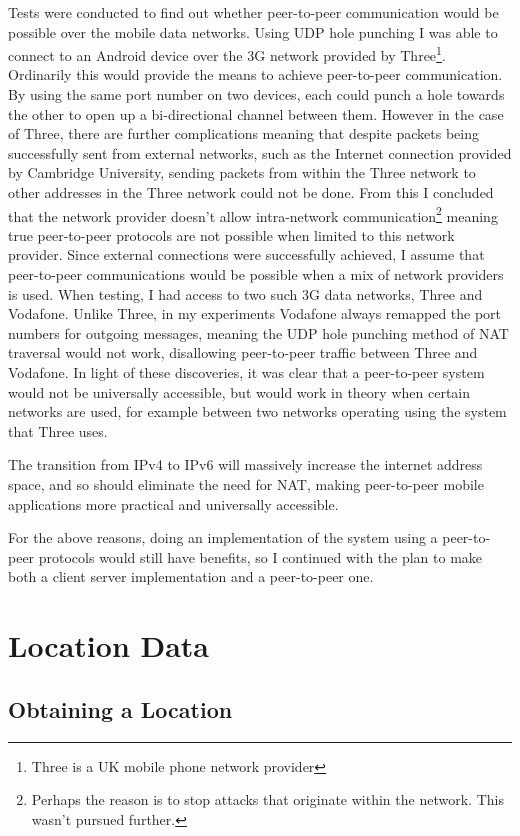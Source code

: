 Tests were conducted to find out whether peer-to-peer communication would be possible over the mobile data networks.
Using UDP hole punching I was able to connect to an Android device over the 3G network provided by Three\footnote{Three is a UK mobile phone network provider}. Ordinarily this would provide the means to achieve peer-to-peer communication. By using the same port number on two devices, each could punch a hole towards the other to open up a bi-directional channel between them. However in the case of Three, there are further complications meaning that despite packets being successfully sent from external networks, such as the Internet connection provided by Cambridge University, sending packets from within the Three network to other addresses in the Three network could not be done. From this I concluded that the network provider doesn't allow intra-network communication\footnote{Perhaps the reason is to stop attacks that originate within the network. This wasn't pursued further.} meaning true peer-to-peer protocols are not possible when limited to this network provider. Since external connections were successfully achieved, I assume that peer-to-peer communications would be possible when a mix of network providers is used. When testing, I had access to two such  3G data networks, Three and Vodafone. Unlike Three, in my experiments Vodafone always remapped the port numbers for outgoing messages, meaning the UDP hole punching method of NAT traversal would not work, disallowing peer-to-peer traffic between Three and Vodafone.
In light of these discoveries, it was clear that a peer-to-peer system would not be universally accessible, but would work in theory when certain networks are used, for example between two networks operating using the system that Three uses.

The transition from IPv4 to IPv6 will massively increase the internet address space\cite{ipv6}, and so should eliminate the need for NAT, making peer-to-peer mobile applications more practical and universally accessible.

For the above reasons, doing an implementation of the system using a peer-to-peer protocols would still have benefits, so I continued with the plan to make both a client server implementation and a peer-to-peer one.

\section{Location Data}

\subsection{Obtaining a Location}

